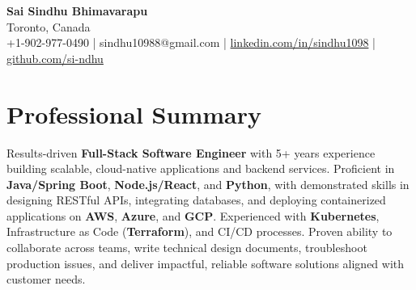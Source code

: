 \documentclass[letterpaper,11pt]{article}
\begin{document}
\begin{center}
  {\Large \textbf{Sai Sindhu Bhimavarapu}} \\
  Toronto, Canada \\
  +1-902-977-0490 \enspace | \enspace sindhu10988@gmail.com \enspace | \enspace \href{https://www.linkedin.com/in/sindhu1098/}{linkedin.com/in/sindhu1098} \enspace | \enspace \href{https://github.com/si-ndhu}{github.com/si-ndhu}
\end{center}

\section{Professional Summary}
  \begin{itemize}[leftmargin=0.15in, label={}]
    \small{\item{
     Results-driven \textbf{Full-Stack Software Engineer} with 5+ years experience building scalable, cloud-native applications and backend services. Proficient in \textbf{Java/Spring Boot}, \textbf{Node.js/React}, and \textbf{Python}, with demonstrated skills in designing RESTful APIs, integrating databases, and deploying containerized applications on \textbf{AWS}, \textbf{Azure}, and \textbf{GCP}. Experienced with \textbf{Kubernetes}, Infrastructure as Code (\textbf{Terraform}), and CI/CD processes. Proven ability to collaborate across teams, write technical design documents, troubleshoot production issues, and deliver impactful, reliable software solutions aligned with customer needs. 
    }}
  \end{itemize}
\vspace{-16pt}

\end{document}
